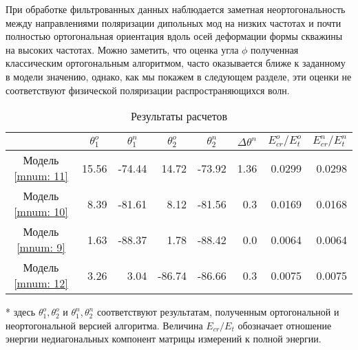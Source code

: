 \documentclass[a4paper,11pt]{article}
\begin{document}
При обработке фильтрованных данных наблюдается заметная неортогональность между направлениями поляризации дипольных мод на низких частотах и почти полностью ортогональная ориентация вдоль осей деформации формы скважины на высоких частотах. Можно заметить, что оценка угла $\phi$ полученная классическим ортогональным алгоритмом, часто оказывается ближе к заданному в модели значению, однако, как мы покажем в следующем разделе, эти оценки не соответствуют физической поляризации распространяющихся волн.

\begin{table}[h]
\footnotesize
\centering
\caption{Результаты расчетов}
\renewcommand{\arraystretch}{1.5}
\begin{tabularx}{\textwidth}{|C|rr|rr|r|rr|}
\hline	
				& &  &  &  & &  &  \\ \hline
\hline Модель \ref{mnum: 11} & 15.56 & -74.44 & 14.72 & -73.92  & 1.36  & 0.0299 & 0.0298 \\
\hline Модель \ref{mnum: 10} & 8.39 & -81.61 & 8.12 & -81.56 & 0.3 & 0.0169 & 0.0168 \\
\hline Модель \ref{mnum: 9} & 1.63 & -88.37 & 1.78 & -88.42  & 0.0  & 0.0064 & 0.0064 \\	   
\hline Модель \ref{mnum: 12} & 3.26 & 3.04 & -86.74  & -86.66  & 0.3 & 0.0075 & 0.0075 \\ 	   
 	   \hline
\end{tabularx} 
\begin{flushleft}
* здесь $\theta_1^o,\theta_2^o$ и $\theta_1^n,\theta_2^n$ соответствуют результатам, полученным ортогональной и неортогональной версией алгоритма. Величина $E_{cr}/E_{t}$ обозначает отношение энергии недиагональных компонент матрицы измерений к полной энергии.
\end{flushleft}
\label{tab:std_process_results}
\renewcommand{\arraystretch}{1.0}
\end{table}
\end{document}
